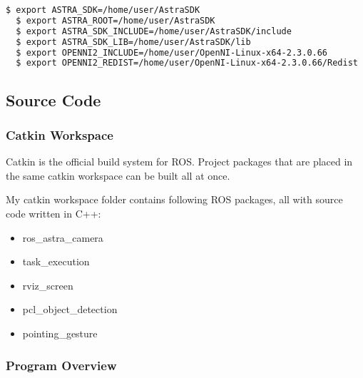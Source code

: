 \begin{lstlisting}[language=bash]
  $ export ASTRA_SDK=/home/user/AstraSDK
  $ export ASTRA_ROOT=/home/user/AstraSDK
  $ export ASTRA_SDK_INCLUDE=/home/user/AstraSDK/include
  $ export ASTRA_SDK_LIB=/home/user/AstraSDK/lib
  $ export OPENNI2_INCLUDE=/home/user/OpenNI-Linux-x64-2.3.0.66
  $ export OPENNI2_REDIST=/home/user/OpenNI-Linux-x64-2.3.0.66/Redist
\end{lstlisting}

\subsection{Source Code}

\subsubsection{Catkin Workspace} 
Catkin is the official build system for ROS. Project packages that are placed in the same catkin workspace can be built all at once.\par
My catkin workspace folder contains following ROS packages, all with source code written in C++: \par

\begin{itemize}
	\item ros\_astra\_camera
    \item task\_execution
    \item rviz\_screen
    \item pcl\_object\_detection
    \item pointing\_gesture
\end{itemize}

\subsubsection{Program Overview} 
  
